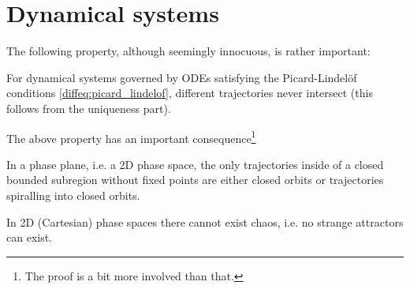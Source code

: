 \section{Dynamical systems}

    The following property, although seemingly innocuous, is rather important:
    \begin{property}
        For dynamical systems governed by ODEs satisfying the Picard-Lindel\"of conditions \ref{diffeq:picard_lindelof}, different trajectories never intersect (this follows from the uniqueness part).
    \end{property}

    The above property has an important consequence\footnote{The proof is a bit more involved than that.}
    \begin{theorem}
        In a phase plane, i.e. a 2D phase space, the only trajectories inside of a closed bounded subregion without fixed points are either closed orbits or trajectories spiralling into closed orbits.
    \end{theorem}
    \begin{result}
        In 2D (Cartesian) phase spaces there cannot exist chaos, i.e. no strange attractors can exist.
    \end{result}



